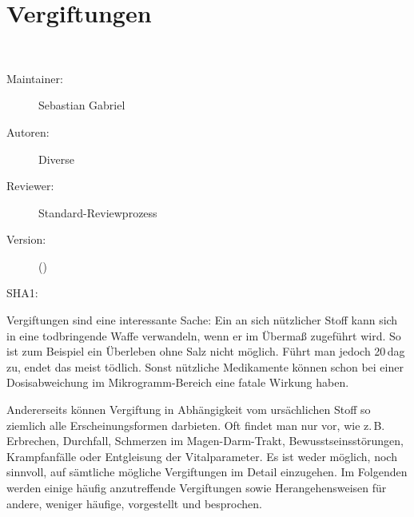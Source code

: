 \def\ChapterCode{TOX}
\chapter
[\CO{[TOX]} Vergiftungen]
{Vergiftungen}
\ChapterIntro
{%
~~~
}
{%
\begin{description}
  \item[Maintainer:] Sebastian Gabriel
  \item[Autoren:] Diverse
  \item[Reviewer:] Standard-Reviewprozess
  \item[Version:] {\DocVersion} ({\DocVersionInfo})
  \item[SHA1:] {\DocGitCommit}
\end{description}

{\TxTeilkapitelAASS}
}
\label{topic:vergiftung}



\clearpage


Vergiftungen sind eine interessante Sache: Ein an sich
nützlicher Stoff kann sich in eine todbringende Waffe
verwandeln, wenn er im Übermaß zugeführt wird. So ist zum
Beispiel ein Überleben ohne Salz nicht möglich. Führt man
jedoch 20\,dag zu, endet das meist tödlich. Sonst nützliche
Medikamente können schon bei einer Dosisabweichung im
Mikrogramm-Bereich eine fatale Wirkung haben.

Andererseits können Vergiftung in Abhängigkeit vom
ursächlichen Stoff so ziemlich alle Erscheinungsformen
darbieten. Oft findet man nur 
vor, wie z.\,B. Erbrechen, Durchfall, Schmerzen im
Magen-Darm-Trakt, Bewusstseinsstörungen, Krampfanfälle oder
Entgleisung der Vitalparameter.
Es ist weder möglich, noch sinnvoll, auf sämtliche mögliche
Vergiftungen im Detail einzugehen. Im Folgenden werden
einige häufig anzutreffende Vergiftungen sowie
Herangehensweisen für andere, weniger häufige, vorgestellt
und besprochen. 





